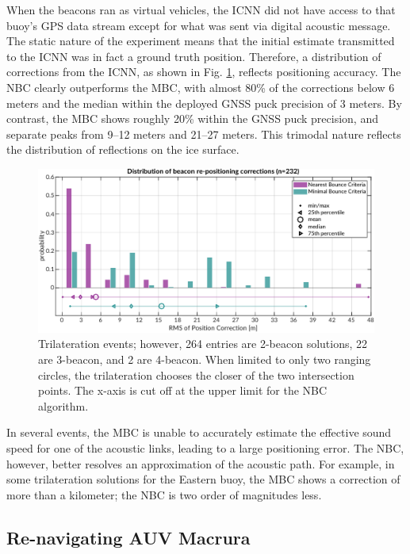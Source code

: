 When the beacons ran as virtual vehicles, the ICNN did not have access to that buoy's GPS data stream except for what was sent via digital acoustic message.
The static nature of the experiment means that the initial estimate transmitted to the ICNN was in fact a ground truth position.
Therefore, a distribution of corrections from the ICNN, as shown in Fig. \ref{fig:trilat-beacon}, reflects positioning accuracy.
The NBC clearly outperforms the MBC, with almost 80\% of the corrections below 6 meters and the median within the deployed GNSS puck precision of 3 meters.
By contrast, the MBC shows roughly 20\% within the GNSS puck precision, and separate peaks from 9--12 meters and 21--27 meters.
This trimodal nature reflects the distribution of reflections on the ice surface.

\begin{figure}[!ht]
\includegraphics[width=\textwidth]{figs/beacon-trilat-stat.pdf}
\caption{Trilateration events; however, 264 entries are 2-beacon solutions, 22 are 3-beacon, and 2 are 4-beacon. When limited to only two ranging circles, the trilateration chooses the closer of the two intersection points. The x-axis is cut off at the upper limit for the NBC algorithm.}
\label{fig:trilat-beacon}
\end{figure}

In several events, the MBC is unable to accurately estimate the effective sound speed for one of the acoustic links, leading to a large positioning error.
The NBC, however, better resolves an approximation of the acoustic path.
For example, in some trilateration solutions for the Eastern buoy, the MBC shows a correction of more than a kilometer; the NBC is two order of magnitudes less.

\subsection{Re-navigating AUV Macrura}

